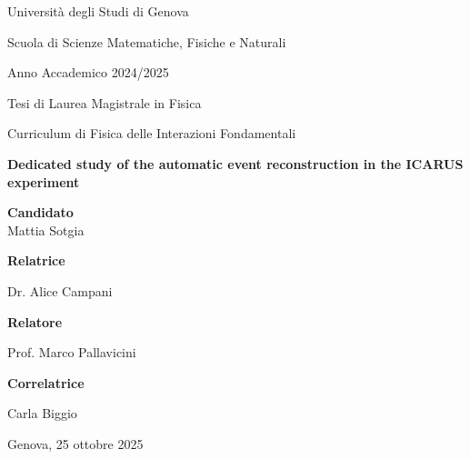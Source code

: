\begin{titlepage}
    \ifdraft\BgThispage\fi
    \begin{center}

        {\large {Università degli Studi di Genova}}

        {\large  Scuola di Scienze Matematiche, Fisiche e Naturali} \\

        \vspace{0.5cm}

        {Anno Accademico 2024/2025}

        \vfill

        Tesi di Laurea Magistrale in Fisica\par
        Curriculum di Fisica delle Interazioni Fondamentali

        \vfill

        \begin{minipage}{0.775\linewidth}
            \centering
            \huge
            \bfseries
            Dedicated study of the automatic event reconstruction in the ICARUS experiment
        \end{minipage}

        \vfill

        \textbf{Candidato}\\{\large Mattia Sotgia}

        \vfill

        \begin{minipage}{0.45\linewidth}
            \textbf{Relatrice}\par
            {\large Dr. Alice Campani}\par\vspace{1em}%
            \textbf{Relatore}\par
            {\large Prof. Marco Pallavicini}%
        \end{minipage}
        \hfill
        \begin{minipage}{0.45\linewidth}
            \raggedleft
            \textbf{Correlatrice}\par
            {\large Carla Biggio}
        \end{minipage}

        \vspace{2cm}

        Genova, 25 ottobre 2025
    \end{center}
\end{titlepage}
